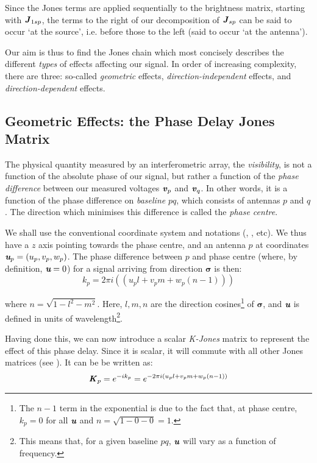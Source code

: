 \pg
Since the Jones terms are applied sequentially to the brightness matrix, starting with $\Jones_{1sp}$, the terms to the right of our decomposition of $\Jones_{sp}$ can be said to occur `at the source', i.e. before those to the left (said to occur `at the antenna').

\pg
Our aim is thus to find the Jones chain which most concisely describes the different \emph{types} of effects affecting our signal. In order of increasing complexity, there are three: so-called \emph{geometric} effects, \emph{direction-independent} effects, and \emph{direction-dependent} effects.

\subsection{Geometric Effects: the Phase Delay Jones Matrix}
\label{section.RIME.JonesChain.Kjones}

\pg
The physical quantity measured by an interferometric array, the \emph{visibility}, is not a function of the absolute phase of our signal, but rather a function of the \emph{phase difference} between our measured voltages $\volt_p$ and $\volt_q$. In other words, it is a function of the phase difference on \emph{baseline} $pq$, which consists of antennas $p$ and $q$. The direction which minimises this difference is called the \emph{phase centre}.

\pg
We shall use the conventional coordinate system and notations (, , etc). We thus have a $z$ axis pointing towards the phase centre, and an antenna $p$ at coordinates $\U_p=(u_p,v_p,w_p)$. The phase difference between $p$ and phase centre (where, by definition, $\U=0$) for a signal arriving from direction $\pmb{\sigma}$ is then:
\begin{equation}
k_p=2\pi i (( u_p l + v_p m + w_p (n-1) ))
\end{equation}

where $n=\sqrt{1-l^2-m^2}$. Here, $l,m,n$ are the direction cosines\footnote{The $n-1$ term in the exponential is due to the fact that, at phase centre, $k_p=0$ for all $\U$ and $n=\sqrt{1-0-0}=1$.} of $\pmb{\sigma}$, and $\U$ is defined in units of wavelength\footnote{This means that, for a given baseline $pq$, $\U$ will vary as a function of frequency.}.

\pg 
Having done this, we can now introduce a scalar \emph{K-Jones} matrix to represent the effect of this phase delay. Since it is scalar, it will commute with all other Jones matrices (see ). It can be be written as:
\begin{equation}
\Kjones_p = e^{-i k_p}  = e^{-2\pi i ( u_p l + v_p m + w_p (n-1) )}
\end{equation}

